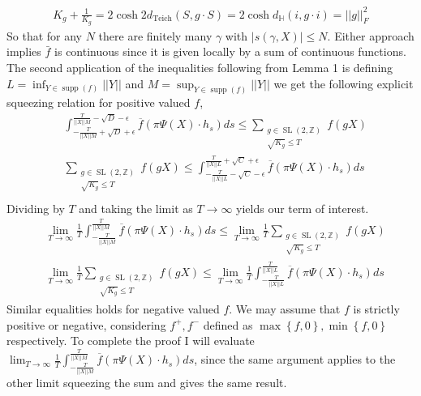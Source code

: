 \documentclass{article}
\newcommand{\set}[1]{\left\{#1\right\}}
\newcommand{\abs}[1]{\left\vert#1\right\vert}
\newcommand{\norm}[1]{\lvert\lvert#1\rvert\rvert}
\newcommand{\slz}{\operatorname{SL}(2,\mathbb{Z})}
\begin{document}
        \begin{align*}
            K_g + \frac{1}{K_g} = 2\cosh2d_{\operatorname{Teich}}(S,g \cdot S) = 2\cosh d_\mathbb{H}(i,g \cdot i) = \norm{g}_{F}^2
        \end{align*}
        So that for any \(N\) there are finitely many \(\gamma\) with \(\abs{s(\gamma,X)} \leq N\). Either approach implies \(\bar{f}\) is continuous since it is given locally by a sum of continuous functions. The second application of the inequalities following from Lemma 1 is defining \(L = \inf_{Y \in \operatorname{supp}(f)}\norm{Y}\) and \(M = \sup_{Y \in \operatorname{supp}(f)}\norm{Y}\) we get the following explicit squeezing relation for positive valued \(f\),
        \begin{align*}
            &\int_{-\frac{T}{\norm{X}M} + \sqrt{D} + \epsilon}^{\frac{T}{\norm{X}M} - \sqrt{D} - \epsilon}\overline{f}(\pi \Psi(X)\cdot h_s)ds \leq \sum_{\substack{g \in \slz \\ \sqrt{K_g} \leq T}} f(g X) \\
            &\sum_{\substack{g \in \slz \\ \sqrt{K_g} \leq T}} f(g X) \leq \int^{\frac{T}{\norm{X}L} + \sqrt{C} + \epsilon}_{-\frac{T}{\norm{X}L} - \sqrt{C} - \epsilon}\overline{f}(\pi \Psi(X)\cdot h_s)ds \\
        \end{align*}
        Dividing by \(T\) and taking the limit as \(T \to \infty\) yields our term of interest.
        \begin{align*}
            &\lim_{T \to \infty} \frac{1}{T} \int_{-\frac{T}{\norm{X}M}}^{\frac{T}{\norm{X}M}}\overline{f}(\pi \Psi(X)\cdot h_s)ds \leq \lim_{T \to \infty} \frac{1}{T}\sum_{\substack{g \in \slz \\ \sqrt{K_g} \leq T}} f(g X)\\
            &\lim_{T \to \infty} \frac{1}{T}\sum_{\substack{g \in \slz \\ \sqrt{K_g} \leq T}} f(g X)  \leq \lim_{T \to \infty} \frac{1}{T} \int_{-\frac{T}{\norm{X}L}}^{\frac{T}{\norm{X}L}}\overline{f}(\pi \Psi(X)\cdot h_s)ds
        \end{align*}
        Similar equalities holds for negative valued \(f\). We may assume that \(f\) is strictly positive or negative, considering \(f^+,f^-\) defined as \(\max\set{f,0}, \min\set{f,0}\) respectively. To complete the proof I will evaluate \(\lim_{T \to \infty} \frac{1}{T} \int_{-\frac{T}{\norm{X}M}}^{\frac{T}{\norm{X}M}}\overline{f}(\pi \Psi(X)\cdot h_s)ds\), since the same argument applies to the other limit squeezing the sum and gives the same result.
\end{document}
